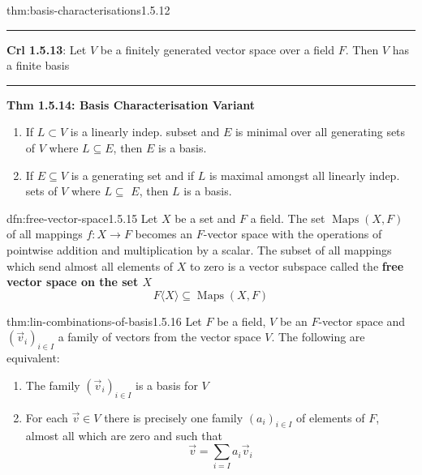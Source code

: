 \documentclass[landscape, 8pt]{extarticle}
\DeclareMathOperator{\Maps}{Maps}
\begin{document}
\begin{multicols}{3}
\begin{thm}{thm:basis-characterisations}{1.5.12}
    \vspace{-10pt}
    \noindent\rule{\textwidth}{0.2pt}
    \textbf{Crl 1.5.13}: Let $V$ be a finitely generated vector space over a field $F$. Then $V$ has a finite basis

    \vspace{-5pt}
    \noindent\rule{\textwidth}{0.2pt}
    \textbf{Thm 1.5.14: Basis Characterisation Variant}
    \vspace{-5pt}
    \begin{enumerate}
        \setlength\itemsep{0em}
        \item If $L \subset V$ is a linearly indep. subset and $E$ is minimal over all generating sets of $V$ where $L \subseteq E$, then $E$ is a basis.
        \item If $E \subseteq V$ is a generating set and if $L$ is maximal amongst all linearly indep. sets of $V$ where $L \subseteq$ $E$, then $L$ is a basis.
    \end{enumerate}
\end{thm}

\vspace{-5pt}
\begin{dfn}{dfn:free-vector-space}{1.5.15}
    Let $X$ be a set and $F$ a field. The set $\Maps(X, F)$ of all mappings $f: X \to F $ becomes an $F$-vector space with the operations of pointwise addition and multiplication by a scalar. The subset of all mappings which send almost all elements of $X$ to zero is a vector subspace called the \textbf{free vector space on the set $X$}
    \[F\langle X \rangle \subseteq \Maps(X, F)\]
\end{dfn}

\vspace{-5pt}
\begin{thm}{thm:lin-combinations-of-basis}{1.5.16}
    Let $F$ be a field, $V$ be an $F$-vector space and $(\vec{v}_{i})_{i\in I}$ a family of vectors from the vector space $V$. The following are equivalent:
    \begin{enumerate}
        \setlength\itemsep{0em}
        \item The family $(\vec{v}_{i})_{i\in I}$ is a basis for $V$
        \item For each $\vec{v}\in V$ there is precisely one family $(a_{i})_{i\in I}$ of elements of $F$, almost all which are zero and such that
            \[\vec{v} = \sum_{i = I} a_{i}\vec{v}_{i}\]
    \end{enumerate}
\end{thm}


\end{multicols}
\end{document}
